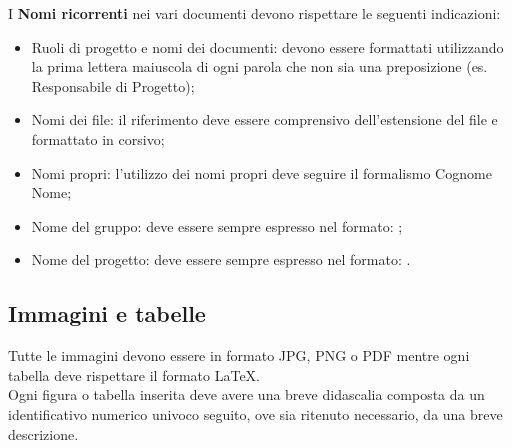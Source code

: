 {{			I \textbf{Nomi ricorrenti} nei vari documenti devono rispettare le seguenti indicazioni:
			\begin{itemize}
				\item Ruoli di progetto e nomi dei documenti: devono essere formattati utilizzando la prima lettera maiuscola di ogni parola che non sia una preposizione (es. Responsabile di Progetto);
				\item Nomi dei file: il riferimento deve essere comprensivo dell’estensione del file e formattato in corsivo;
				\item Nomi propri: l’utilizzo dei nomi propri deve seguire il formalismo Cognome Nome;
				\item Nome del gruppo: deve essere sempre espresso nel formato: \gruppo;
				\item Nome del progetto: deve essere sempre espresso nel formato: \premi.
			\end{itemize}
			}
		\subsection{Immagini e tabelle}{
			\label{sub:img}
			Tutte le immagini devono essere in formato JPG, PNG o PDF mentre ogni tabella deve rispettare il formato \LaTeX.\\
			Ogni figura o tabella inserita deve avere una breve didascalia composta da un identificativo numerico univoco seguito, ove sia ritenuto necessario, da una breve descrizione.
			
			}

		}